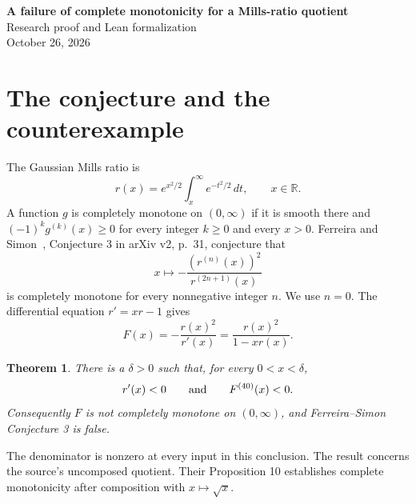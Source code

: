 \documentclass[11pt]{article}
\newtheorem{theorem}{Theorem}
\newcommand{\R}{\mathbb R}
\begin{document}
\begin{center}
{\Large\bfseries A failure of complete monotonicity for a Mills-ratio quotient}\\[.5em]
Research proof and Lean formalization\\
October 26, 2026
\end{center}
\begin{abstract}
We refute Ferreira--Simon Conjecture 3 on quotients of derivatives of the
Gaussian Mills ratio. Already the quotient $-r^2/r'$ has a negative
fortieth derivative throughout some interval of positive inputs. The proof
reduces the derivative at zero to an integer polynomial in $\pi/2$ of
degree 21. An exact rational Bernstein certificate proves its negativity
using six-decimal bounds on $\pi$; continuity gives a regular positive-input
counterexample. The literal Gaussian tail, derivative recurrences, finite
polynomial certificate, and positive-interval conclusion are formalized in Lean.
\end{abstract}

\section{The conjecture and the counterexample}
The Gaussian Mills ratio is
\begin{equation}\label{mills}
 r(x)=e^{x^2/2}\int_x^\infty e^{-t^2/2}\,dt,\qquad x\in\R.
\end{equation}
A function $g$ is completely monotone on $(0,\infty)$ if it is smooth there
and $(-1)^k g^{(k)}(x)\ge0$ for every integer $k\ge0$ and every $x>0$.
Ferreira and Simon~\cite{FS}, Conjecture 3 in arXiv v2, p.~31, conjecture
that
\[
 x\longmapsto-\frac{(r^{(n)}(x))^2}{r^{(2n+1)}(x)}
\]
is completely monotone for every nonnegative integer $n$. We use $n=0$.
The differential equation $r'=xr-1$ gives
\begin{equation}\label{F}
 F(x)=-\frac{r(x)^2}{r'(x)}=\frac{r(x)^2}{1-xr(x)}.
\end{equation}

\begin{theorem}\label{counterexample}
There is a $\delta>0$ such that, for every $0<x<\delta$,
\[
 r'(x)<0\qquad\hbox{and}\qquad F^{(40)}(x)<0.
\]
Consequently $F$ is not completely monotone on $(0,\infty)$, and
Ferreira--Simon Conjecture 3 is false.
\end{theorem}
The denominator is nonzero at every input in this conclusion. The result
concerns the source's uncomposed quotient. Their Proposition 10 establishes
complete monotonicity after composition with $x\mapsto\sqrt{x}$.
\end{document}
